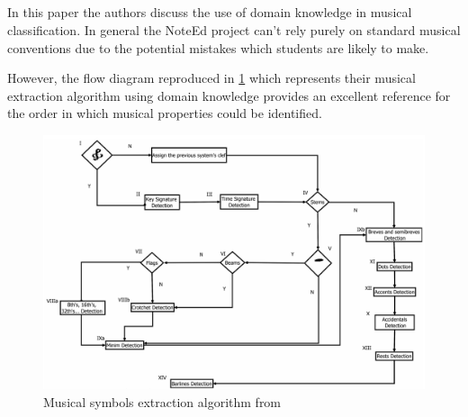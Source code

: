 \subsection{\cite{rebelo2011method}}
\label{sec:arebelo-domain-knowledge}
In this paper the authors discuss the use of domain knowledge in musical classification. In general the NoteEd project can't rely purely on standard musical conventions due to the potential mistakes which students are likely to make. 

However, the flow diagram reproduced in \cref{fig:arebelo-flow} which represents their musical extraction algorithm using domain knowledge provides an excellent reference for the order in which musical properties could be identified.
\begin{figure}[H]
  \includegraphics[width=\linewidth]{gfx/prior-research/arebelo-flow.png}
  \caption{Musical symbols extraction algorithm from \cite{rebelo2011method}}
  \label{fig:arebelo-flow}
\end{figure}
